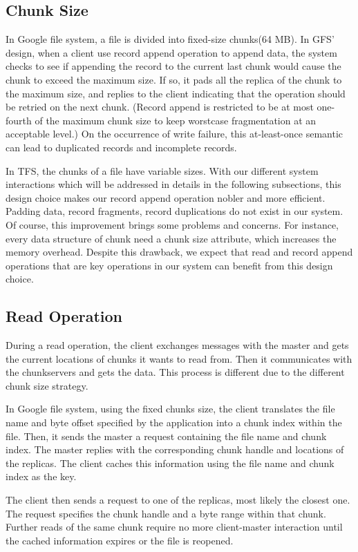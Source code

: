 \documentclass[letterpaper,twocolumn,10pt]{article}
\begin{document}
\subsection{Chunk Size}
In Google file system, a file is divided into fixed-size chunks(64 MB). In GFS' design, when a client use record append operation to append data, the system checks to see if appending the record to the current last chunk would cause the chunk to exceed the maximum size. If so, it pads all the replica of the chunk to the maximum size, and replies to the client indicating that the operation should be retried on the next chunk. (Record append is restricted to be at most one-fourth of the maximum chunk size to keep worstcase fragmentation at an acceptable level.) On the occurrence of write failure, this at-least-once semantic can lead to duplicated records and incomplete records.

In TFS, the chunks of a file have variable sizes. With our different system interactions which will be addressed in details in the following subsections, this design choice makes our record append operation nobler and more efficient. Padding data, record fragments, record duplications do not exist in our system. Of course, this improvement brings some problems and concerns. For instance, every data structure of chunk need a chunk size attribute, which increases the memory overhead. Despite this drawback, we expect that read and record append operations that are key operations in our system can benefit from this design choice. 
\subsection{Read Operation}
During a read operation, the client exchanges messages with the master and gets the current locations of chunks it wants to read from. Then it communicates with the chunkservers and gets the data. This process is different due to the different chunk size strategy. 

In Google file system, using the fixed chunks size, the client translates the file name and byte offset specified by the application into a chunk index within the file. Then, it sends the master a request containing the file name and chunk index. The master replies with the corresponding chunk handle and locations of the replicas. The client caches this information using the file name and chunk index as the key.

The client then sends a request to one of the replicas, most likely the closest one. The request specifies the chunk handle and a byte range within that chunk. Further reads of the same chunk require no more client-master interaction until the cached information expires or the file is reopened.
\end{document}
